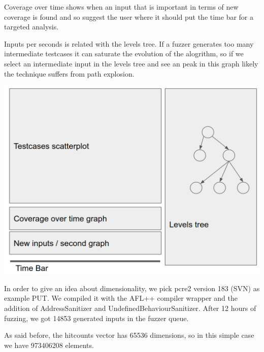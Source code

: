 \documentclass[conference,compsoc]{IEEEtran}
\begin{document}
Coverage over time shows when an input that is important in terms of new coverage is found and so suggest the user where it should put the time bar for a targeted analysis.

Inputs per seconds is related with the levels tree. If a fuzzer generates too many intermediate testcases it can saturate the evolution of the alogrithm, so if we select an intermediate input in the levels tree and see an peak in this graph likely the technique suffers from path explosion.

\begin{center}
\includegraphics[scale=0.2]{mockup}
\end{center}

In order to give an idea about dimensionality, we pick pcre2 version 183 (SVN) as example PUT. We compiled it with the AFL++ compiler wrapper and the addition of AddressSanitizer and UndefinedBehaviourSanitizer. After 12 hours of fuzzing, we got 14853 generated inputs in the fuzzer queue.

As said before, the hitcounts vector has 65536 dimensions, so in this simple case we have 973406208 elements.



\end{document}

